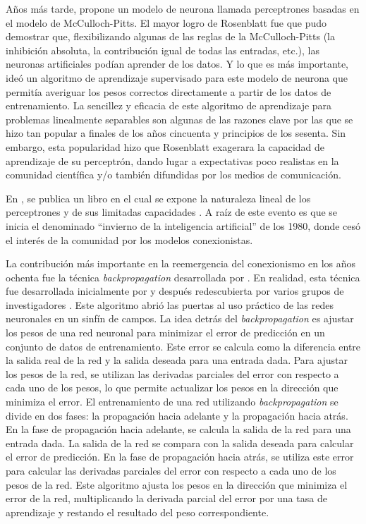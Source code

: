 Años más tarde, \cite{rosenblatt1958perceptron} propone un modelo de neurona llamada perceptrones basadas en el modelo
de McCulloch-Pitts. El mayor logro de Rosenblatt fue que pudo demostrar que, flexibilizando algunas de las reglas de la
McCulloch-Pitts (la inhibición absoluta, la contribución igual de todas las entradas, etc.), las neuronas artificiales
podían aprender de los datos. Y lo que es más importante, ideó un algoritmo de aprendizaje supervisado para este modelo
de neurona que permitía averiguar los pesos correctos directamente a partir de los datos de entrenamiento. La sencillez
y eficacia de este algoritmo de aprendizaje para problemas linealmente separables son algunas de las razones clave por
las que se hizo tan popular a finales de los años cincuenta y principios de los sesenta. Sin embargo, esta popularidad
hizo que Rosenblatt exagerara la capacidad de aprendizaje de su perceptrón, dando lugar a expectativas poco realistas
en la comunidad científica y/o también difundidas por los medios de comunicación.

En \citeyear{minsky1969perceptrons}, se publica un libro en el cual se expone la naturaleza lineal de los perceptrones
y de sus limitadas capacidades \parencite{minsky1969perceptrons}. A raíz de este evento es que se inicia el denominado ``invierno de la inteligencia
artificial'' de los 1980, donde cesó el interés de la comunidad por los modelos conexionistas.

La contribución más importante en la reemergencia del conexionismo en los años ochenta fue la técnica {\it
backpropagation} desarrollada por \cite{rumelhart1986learning}. En realidad, esta técnica fue desarrollada inicialmente
por \cite{werbos1974beyond} y después redescubierta por varios grupos de investigadores \parencite{lecun1985learning, rumelhart1986learning}. Este algoritmo abrió las puertas al uso práctico de las redes
neuronales en un sinfín de campos. La idea detrás del {\it backpropagation} es ajustar los pesos de una red neuronal
para minimizar el error de predicción en un conjunto de datos de entrenamiento. Este error se calcula como la
diferencia entre la salida real de la red y la salida deseada para una entrada dada. Para ajustar los pesos de la red,
se utilizan las derivadas parciales del error con respecto a cada uno de los pesos, lo que permite actualizar los pesos
en la dirección que minimiza el error. El entrenamiento de una red utilizando {\it backpropagation} se divide en dos
fases: la propagación hacia adelante y la propagación hacia atrás. En la fase de propagación hacia adelante, se calcula
la salida de la red para una entrada dada. La salida de la red se compara con la salida deseada para calcular el error
de predicción. En la fase de propagación hacia atrás, se utiliza este error para calcular las derivadas parciales del
error con respecto a cada uno de los pesos de la red. Este algoritmo ajusta los pesos en la dirección que minimiza el
error de la red, multiplicando la derivada parcial del error por una tasa de aprendizaje y restando el resultado del
peso correspondiente.

